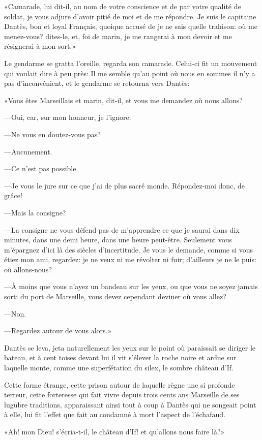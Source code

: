 «Camarade, lui dit-il, au nom de votre conscience et de par votre qualité de soldat, je vous adjure d'avoir pitié de moi et de me répondre. Je suis le capitaine Dantès, bon et loyal Français, quoique accusé de je ne sais quelle trahison: où me menez-vous? dites-le, et, foi de marin, je me rangerai à mon devoir et me résignerai à mon sort.»

Le gendarme se gratta l'oreille, regarda son camarade. Celui-ci fit un mouvement qui voulait dire à peu près: Il me semble qu'au point où nous en sommes il n'y a pas d'inconvénient, et le gendarme se retourna vers Dantès:

«Vous êtes Marseillais et marin, dit-il, et vous me demandez où nous allons?

—Oui, car, sur mon honneur, je l'ignore.

—Ne vous en doutez-vous pas?

—Aucunement.

—Ce n'est pas possible.

—Je vous le jure sur ce que j'ai de plus sacré monde. Répondez-moi donc, de grâce!

—Mais la consigne?

—La consigne ne vous défend pas de m'apprendre ce que je saurai dans dix minutes, dans une demi heure, dans une heure peut-être. Seulement vous m'épargnez d'ici là des siècles d'incertitude. Je vous le demande, comme si vous étiez mon ami, regardez: je ne veux ni me révolter ni fuir; d'ailleurs je ne le puis: où allons-nous?

—À moins que vous n'ayez un bandeau sur les yeux, ou que vous ne soyez jamais sorti du port de Marseille, vous devez cependant deviner où vous allez?

—Non.

—Regardez autour de vous alors.»

Dantès se leva, jeta naturellement les yeux sur le point où paraissait se diriger le bateau, et à cent toises devant lui il vit s'élever la roche noire et ardue sur laquelle monte, comme une superfétation du silex, le sombre château d'If.

Cette forme étrange, cette prison autour de laquelle règne une si profonde terreur, cette forteresse qui fait vivre depuis trois cents ans Marseille de ses lugubre traditions, apparaissant ainsi tout à coup à Dantès qui ne songeait point à elle, lui fit l'effet que fait au condamné à mort l'aspect de l'échafaud.

«Ah! mon Dieu! s'écria-t-il, le château d'If! et qu'allons nous faire là?»

